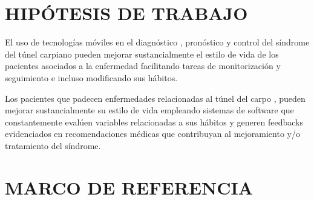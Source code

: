 \documentclass[a4paper,man,natbib]{apa6}
\begin{document}
\section{HIPÓTESIS DE TRABAJO}
El uso de tecnologías móviles en el diagnóstico , pronóstico y control del síndrome del túnel carpiano pueden mejorar sustancialmente el estilo de vida de los pacientes asociados a la enfermedad facilitando tareas de monitorización y seguimiento e incluso modificando sus hábitos.

Los pacientes que padecen enfermedades relacionadas al túnel del carpo , pueden mejorar sustancialmente su estilo de vida empleando sistemas de software que constantemente evalúen variables relacionadas a sus hábitos y generen feedbacks  evidenciados en recomendaciones médicas que contribuyan al mejoramiento y/o tratamiento del síndrome.



\section{MARCO DE REFERENCIA}
\end{document}
